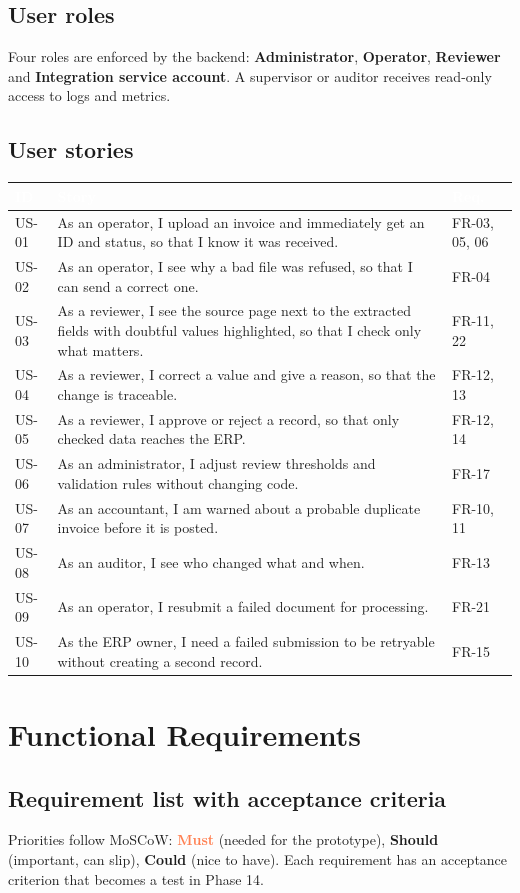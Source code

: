 \documentclass[11pt,a4paper]{report}
\newcommand{\hdr}[1]{\textcolor{white}{\sffamily\bfseries #1}}
\newcommand{\tblstart}{\rowcolors{2}{white}{rowgray}\arrayrulecolor{teal!60}}
\newcommand{\hdrrow}{\rowcolor{navy}}
\newcommand{\must}{\textcolor{coral}{\sffamily\bfseries Must}}
\newcommand{\should}{\textcolor{amber!85!black}{\sffamily\bfseries Should}}
\newcommand{\could}{\textcolor{tealdark}{\sffamily\bfseries Could}}
\begin{document}
\section{User roles}
Four roles are enforced by the backend: \textbf{Administrator}, \textbf{Operator}, \textbf{Reviewer} and \textbf{Integration service account}. A supervisor or auditor receives read-only access to logs and metrics.

\section{User stories}
{\tblstart\small
\begin{longtable}{L{1.2cm}L{10.4cm}L{2.0cm}}
\hdrrow \hdr{ID} & \hdr{Story} & \hdr{Req.}\\ \endhead
US-01 & As an operator, I upload an invoice and immediately get an ID and status, so that I know it was received. & FR-03, 05, 06\\
US-02 & As an operator, I see why a bad file was refused, so that I can send a correct one. & FR-04\\
US-03 & As a reviewer, I see the source page next to the extracted fields with doubtful values highlighted, so that I check only what matters. & FR-11, 22\\
US-04 & As a reviewer, I correct a value and give a reason, so that the change is traceable. & FR-12, 13\\
US-05 & As a reviewer, I approve or reject a record, so that only checked data reaches the ERP. & FR-12, 14\\
US-06 & As an administrator, I adjust review thresholds and validation rules without changing code. & FR-17\\
US-07 & As an accountant, I am warned about a probable duplicate invoice before it is posted. & FR-10, 11\\
US-08 & As an auditor, I see who changed what and when. & FR-13\\
US-09 & As an operator, I resubmit a failed document for processing. & FR-21\\
US-10 & As the ERP owner, I need a failed submission to be retryable without creating a second record. & FR-15\\
\hline
\end{longtable}}

\chapter{Functional Requirements}
\section{Requirement list with acceptance criteria}
Priorities follow MoSCoW: \must{} (needed for the prototype), \should{} (important, can slip), \could{} (nice to have). Each requirement has an acceptance criterion that becomes a test in Phase 14.
\end{document}
